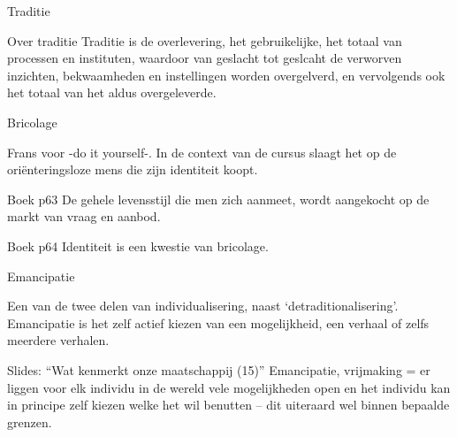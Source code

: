 \documentclass[main.tex]{subfiles}
\begin{document}
\begin{examenvraag}
    \begin{vraag}
        Traditie
    \end{vraag}

    \begin{antwoord}

        \begin{citaat}{Over traditie}
            Traditie is de overlevering, het gebruikelijke, het totaal van processen en 
            instituten, waardoor van geslacht tot geslcaht de verworven inzichten,
            bekwaamheden en instellingen worden overgelverd, en vervolgends ook het totaal 
            van het aldus overgeleverde.
        \end{citaat}
    \end{antwoord}
\end{examenvraag}

\begin{examenvraag}
    \begin{vraag}
        Bricolage
    \end{vraag}

    \begin{antwoord}
        Frans voor -do it yourself-. In de context van de cursus slaagt het op de ori\"{e}nteringsloze mens die zijn identiteit koopt. 
        \begin{citaat}{Boek p63}
            De gehele levensstijl die men zich aanmeet, wordt aangekocht op de markt van vraag en aanbod.
        \end{citaat}
        \begin{citaat}{Boek p64}
            Identiteit is een kwestie van bricolage.
        \end{citaat}
    \end{antwoord}

\end{examenvraag}

\begin{examenvraag}
    \begin{vraag}
        Emancipatie
    \end{vraag}

    \begin{antwoord}
   		Een van de twee delen van individualisering, naast `detraditionalisering'. Emancipatie is het zelf actief kiezen van een mogelijkheid, een verhaal of zelfs meerdere verhalen.
   		\begin{citaat}{Slides: ``Wat kenmerkt onze maatschappij (15)''}
   		            Emancipatie, vrijmaking = er liggen voor elk individu in de wereld vele mogelijkheden open en het individu kan in principe zelf kiezen welke het wil benutten – dit uiteraard wel binnen bepaalde grenzen.
 		\end{citaat}
    \end{antwoord}
\end{examenvraag}
\end{document}
